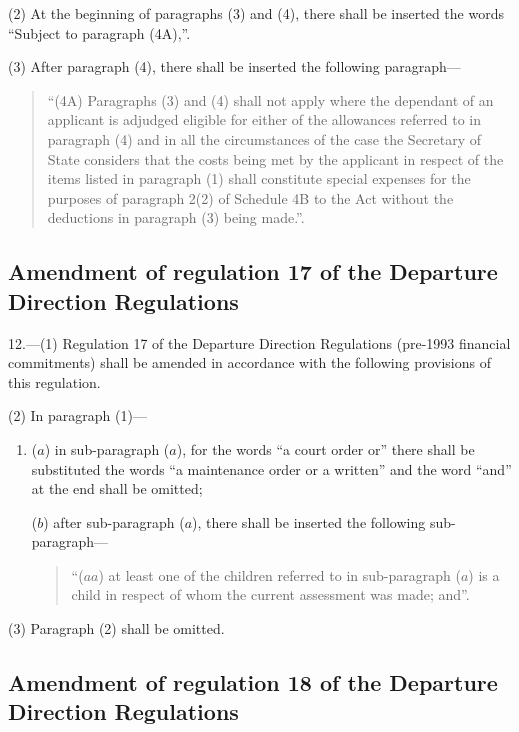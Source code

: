 \documentclass[12pt,a4paper]{article}
\begin{document}
(2) At the beginning of paragraphs (3) and (4), there shall be inserted the words “Subject to paragraph (4A),”.

(3) After paragraph (4), there shall be inserted the following paragraph—
\begin{quotation}
“(4A) Paragraphs (3) and (4) shall not apply where the dependant of an applicant is adjudged eligible for either of the allowances referred to in paragraph (4) and in all the circumstances of the case the Secretary of State considers that the costs being met by the applicant in respect of the items listed in paragraph (1) shall constitute special expenses for the purposes of paragraph 2(2) of Schedule 4B to the Act without the deductions in paragraph (3) being made.”.
\end{quotation}

\subsection[12. Amendment of regulation 17 of the Departure Direction Regulations]{Amendment of regulation 17 of the Departure Direction Regulations}

12.—(1) Regulation 17 of the Departure Direction Regulations (pre-1993 financial commitments) shall be amended in accordance with the following provisions of this regulation.

(2) In paragraph (1)—
\begin{enumerate}\item[]
($a$) in sub-paragraph ($a$), for the words “a court order or” there shall be substituted the words “a maintenance order or a written” and the word “and” at the end shall be omitted;

($b$) after sub-paragraph ($a$), there shall be inserted the following sub-paragraph—
\begin{quotation}
“($aa$) at least one of the children referred to in sub-paragraph ($a$) is a child in respect of whom the current assessment was made; and”.
\end{quotation}
\end{enumerate}

(3) Paragraph (2) shall be omitted.

\subsection[13. Amendment of regulation 18 of the Departure Direction Regulations]{Amendment of regulation 18 of the Departure Direction Regulations}
\end{document}
